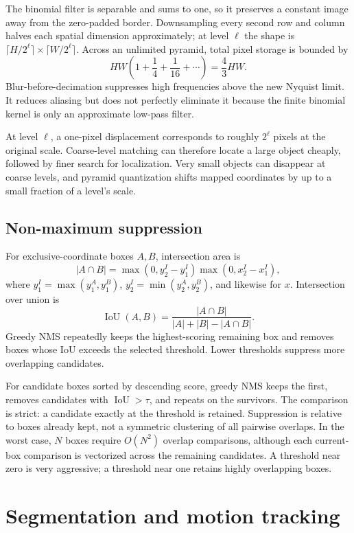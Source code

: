 \documentclass[11pt,a4paper]{article}
\newcommand{\1}{\mathbf{1}}
\begin{document}
The binomial filter is separable and sums to one, so it preserves a constant
image away from the zero-padded border. Downsampling every second row and
column halves each spatial dimension approximately; at level $\ell$ the shape
is $\lceil H/2^\ell\rceil\times\lceil W/2^\ell\rceil$. Across an unlimited
pyramid, total pixel storage is bounded by
\[
 HW\left(1+\frac14+\frac1{16}+\cdots\right)=\frac43HW.
\]
Blur-before-decimation suppresses high frequencies above the new Nyquist
limit. It reduces aliasing but does not perfectly eliminate it because the
finite binomial kernel is only an approximate low-pass filter.

At level $\ell$, a one-pixel displacement corresponds to roughly $2^\ell$
pixels at the original scale. Coarse-level matching can therefore locate a
large object cheaply, followed by finer search for localization. Very small
objects can disappear at coarse levels, and pyramid quantization shifts mapped
coordinates by up to a small fraction of a level's scale.

\subsection{Non-maximum suppression}

For exclusive-coordinate boxes $A,B$, intersection area is
\[
 |A\cap B|=\max(0,y_2^I-y_1^I)\max(0,x_2^I-x_1^I),
\]
where $y_1^I=\max(y_1^A,y_1^B)$, $y_2^I=\min(y_2^A,y_2^B)$, and likewise for
$x$. Intersection over union is
\[
 \operatorname{IoU}(A,B)=\frac{|A\cap B|}{|A|+|B|-|A\cap B|}.
\]
Greedy NMS repeatedly keeps the highest-scoring remaining box and removes
boxes whose IoU exceeds the selected threshold. Lower thresholds suppress more
overlapping candidates.

For candidate boxes sorted by descending score, greedy NMS keeps the first,
removes candidates with $\operatorname{IoU}>\tau$, and repeats on the survivors.
The comparison is strict: a candidate exactly at the threshold is retained.
Suppression is relative to boxes already kept, not a symmetric clustering of
all pairwise overlaps. In the worst case, $N$ boxes require $O(N^2)$ overlap
comparisons, although each current-box comparison is vectorized across the
remaining candidates. A threshold near zero is very aggressive; a threshold
near one retains highly overlapping boxes.

\section{Segmentation and motion tracking}
\end{document}
